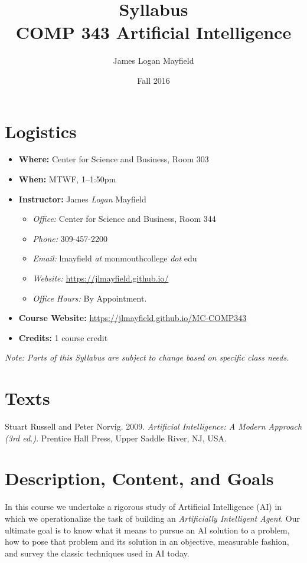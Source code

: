 \documentclass[]{tufte-handout}
\title{Syllabus \\ COMP 343 Artificial Intelligence}
\author{ James Logan Mayfield }
\date{Fall 2016}
\begin{document}
\maketitle

\section{Logistics}
\begin{itemize}
\item \textbf{Where: } Center for Science and Business, Room 303
\item \textbf{When: } MTWF,  1--1:50pm
\item \textbf{Instructor:} James \textit{Logan} Mayfield
\begin{itemize}
\item \textit{Office: } Center for Science and Business, Room 344
\item \textit{Phone: } 309-457-2200 %
\item \textit{Email: } lmayfield \textit{at} monmouthcollege \textit{dot} edu
\item \textit{Website: } \url{https://jlmayfield.github.io/}
\item \textit{Office Hours: } By Appointment.
\end{itemize}
\item \textbf{Course Website: } \url{https://jlmayfield.github.io/MC-COMP343}
\item \textbf{Credits: } 1 course credit
\end{itemize}
\emph{Note: Parts of this Syllabus are subject to change based on specific class needs.}

\section{Texts}

\noindent Stuart Russell and Peter Norvig. 2009. \textit{Artificial Intelligence: A Modern Approach (3rd ed.)}. Prentice Hall Press, Upper Saddle River, NJ, USA\@.

\section{Description, Content, and Goals}

In this course we undertake a rigorous study of Artificial Intelligence (AI) in which we
operationalize the task of building an \textit{Artificially Intelligent Agent}. Our
ultimate goal is to know what it means to pursue an AI solution to a problem, how
to pose that problem and its solution in an objective, measurable fashion, and
survey the classic techniques used in AI today.
\end{document}
